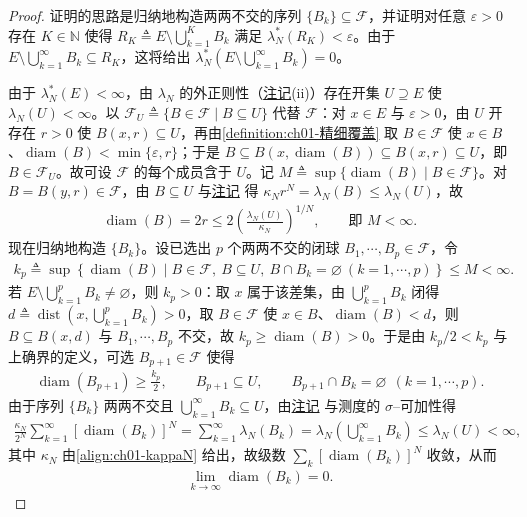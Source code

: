 \documentclass[../../main.tex]{subfiles}%
\begin{document}
\begin{proof}
证明的思路是归纳地构造两两不交的序列 $\{B_k\}\subseteq\mathcal{F}$，并证明对任意 $\varepsilon>0$ 存在 $K\in\mathbb{N}$ 使得 $R_K\triangleq E\setminus\bigcup_{k=1}^KB_k$ 满足 $\lambda_N^*(R_K)<\varepsilon$。由于 $E\setminus\bigcup_{k=1}^\infty B_k\subseteq R_K$，这将给出 $\lambda_N^*(E\setminus\bigcup_{k=1}^\infty B_k)=0$。

由于 $\lambda_N^*(E)<\infty$，由 $\lambda_N$ 的外正则性（\hyperref[remark:ch01-Lebesgue性质]{注记}(ii)）存在开集 $U\supseteq E$ 使 $\lambda_N(U)<\infty$。以 $\mathcal{F}_U\triangleq\{B\in\mathcal{F}\mid B\subseteq U\}$ 代替 $\mathcal{F}$：对 $x\in E$ 与 $\varepsilon>0$，由 $U$ 开存在 $r>0$ 使 $B(x,r)\subseteq U$，再由\cref{definition:ch01-精细覆盖} 取 $B\in\mathcal{F}$ 使 $x\in B$、$\operatorname{diam}(B)<\min\{\varepsilon,r\}$；于是 $B\subseteq B(x,\operatorname{diam}(B))\subseteq B(x,r)\subseteq U$，即 $B\in\mathcal{F}_U$。故可设 $\mathcal{F}$ 的每个成员含于 $U$。记 $M\triangleq\sup\{\operatorname{diam}(B)\mid B\in\mathcal{F}\}$。对 $B=B(y,r)\in\mathcal{F}$，由 $B\subseteq U$ 与\hyperref[remark:ch01-位似]{注记} 得 $\kappa_Nr^N=\lambda_N(B)\leqslant\lambda_N(U)$，故
\begin{align*}
\operatorname{diam}(B)=2r\leqslant2\left(\frac{\lambda_N(U)}{\kappa_N}\right)^{1/N},\qquad\text{即 }M<\infty.
\end{align*}
现在归纳地构造 $\{B_k\}$。设已选出 $p$ 个两两不交的闭球 $B_1,\cdots ,B_p\in\mathcal{F}$，令
\begin{align*}
k_p\triangleq\sup\left\{\operatorname{diam}(B)\mid B\in\mathcal{F},\ B\subseteq U,\ B\cap B_k=\varnothing\ (k=1,\cdots ,p)\right\}\leqslant M<\infty.
\end{align*}
若 $E\setminus\bigcup_{k=1}^pB_k\neq\varnothing$，则 $k_p>0$：取 $x$ 属于该差集，由 $\bigcup_{k=1}^pB_k$ 闭得 $d\triangleq\operatorname{dist}(x,\bigcup_{k=1}^pB_k)>0$，取 $B\in\mathcal{F}$ 使 $x\in B$、$\operatorname{diam}(B)<d$，则 $B\subseteq B(x,d)$ 与 $B_1,\cdots ,B_p$ 不交，故 $k_p\geqslant\operatorname{diam}(B)>0$。于是由 $k_p/2<k_p$ 与上确界的定义，可选 $B_{p+1}\in\mathcal{F}$ 使得
\begin{align}
\operatorname{diam}(B_{p+1})\geqslant\frac{k_p}{2},\qquad B_{p+1}\subseteq U,\qquad B_{p+1}\cap B_k=\varnothing\ \ (k=1,\cdots ,p). \label{align:ch01-Vitali选择}
\end{align}
由于序列 $\{B_k\}$ 两两不交且 $\bigcup_{k=1}^\infty B_k\subseteq U$，由\hyperref[remark:ch01-位似]{注记} 与测度的 $\sigma$--可加性得
\begin{align}
\frac{\kappa_N}{2^N}\sum_{k=1}^\infty[\operatorname{diam}(B_k)]^N=\sum_{k=1}^\infty\lambda_N(B_k)=\lambda_N\left(\bigcup_{k=1}^\infty B_k\right)\leqslant\lambda_N(U)<\infty, \label{align:ch01-Vitali和}
\end{align}
其中 $\kappa_N$ 由\eqref{align:ch01-kappaN} 给出，故级数 $\sum_k[\operatorname{diam}(B_k)]^N$ 收敛，从而
\begin{align}
\lim_{k\to\infty}\operatorname{diam}(B_k)=0. \label{align:ch01-Vitali直径趋于零}
\end{align}


\end{proof}
\end{document}
